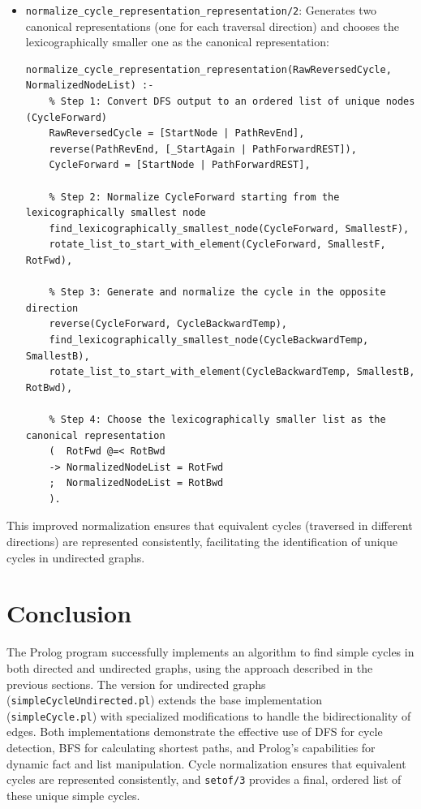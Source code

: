 \documentclass[12pt,a4paper]{article}
\begin{document}
\begin{itemize}
\item \texttt{normalize\_cycle\_representation\_representation/2}: Generates two canonical representations (one for each traversal direction) and chooses the lexicographically smaller one as the canonical representation:

\begin{lstlisting}[style=prologstyle, basicstyle=\ttfamily\footnotesize]
normalize_cycle_representation_representation(RawReversedCycle, NormalizedNodeList) :-
    % Step 1: Convert DFS output to an ordered list of unique nodes (CycleForward)
    RawReversedCycle = [StartNode | PathRevEnd],
    reverse(PathRevEnd, [_StartAgain | PathForwardREST]),
    CycleForward = [StartNode | PathForwardREST],

    % Step 2: Normalize CycleForward starting from the lexicographically smallest node
    find_lexicographically_smallest_node(CycleForward, SmallestF),
    rotate_list_to_start_with_element(CycleForward, SmallestF, RotFwd),

    % Step 3: Generate and normalize the cycle in the opposite direction
    reverse(CycleForward, CycleBackwardTemp),
    find_lexicographically_smallest_node(CycleBackwardTemp, SmallestB),
    rotate_list_to_start_with_element(CycleBackwardTemp, SmallestB, RotBwd),

    % Step 4: Choose the lexicographically smaller list as the canonical representation
    (  RotFwd @=< RotBwd
    -> NormalizedNodeList = RotFwd
    ;  NormalizedNodeList = RotBwd
    ).
\end{lstlisting}
\end{itemize}

This improved normalization ensures that equivalent cycles (traversed in different directions) are represented consistently, facilitating the identification of unique cycles in undirected graphs.

\section{Conclusion}
The Prolog program successfully implements an algorithm to find simple cycles in both directed and undirected graphs, using the approach described in the previous sections. The version for undirected graphs (\texttt{simpleCycleUndirected.pl}) extends the base implementation (\texttt{simpleCycle.pl}) with specialized modifications to handle the bidirectionality of edges. Both implementations demonstrate the effective use of DFS for cycle detection, BFS for calculating shortest paths, and Prolog's capabilities for dynamic fact and list manipulation. Cycle normalization ensures that equivalent cycles are represented consistently, and \texttt{setof/3} provides a final, ordered list of these unique simple cycles.
\end{document}
